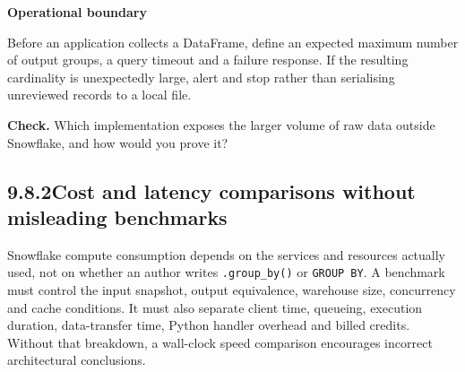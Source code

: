 \documentclass[11pt,twoside]{article}
\newcommand{\topic}[2]{\subsection*{#1\quad #2}}
\begin{document}
\begin{whitebox}\textbf{Operational boundary}\par
Before an application collects a DataFrame, define an expected maximum number of output groups, a query timeout and a failure response. If the resulting cardinality is unexpectedly large, alert and stop rather than serialising unreviewed records to a local file.\end{whitebox}
\textbf{Check.} Which implementation exposes the larger volume of raw data outside Snowflake, and how would you prove it?
\newpage
\topic{9.8.2}{Cost and latency comparisons without misleading benchmarks}
Snowflake compute consumption depends on the services and resources actually used, not on whether an author writes \texttt{.group\_by()} or \texttt{GROUP BY}. A benchmark must control the input snapshot, output equivalence, warehouse size, concurrency and cache conditions. It must also separate client time, queueing, execution duration, data-transfer time, Python handler overhead and billed credits. Without that breakdown, a wall-clock speed comparison encourages incorrect architectural conclusions.
\end{document}
